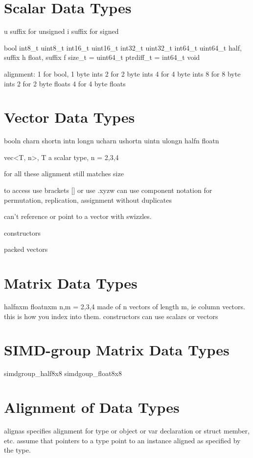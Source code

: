 

\section{Scalar Data Types}
u suffix for unsigned
i suffix for signed

bool
int8_t
uint8_t
int16_t
uint16_t
int32_t
uint32_t
int64_t
uint64_t
half, suffix h
float, suffix f
size_t = uint64_t
ptrdiff_t = int64_t
void

alignment:
1 for bool, 1 byte ints
2 for 2 byte ints
4 for 4 byte ints
8 for 8 byte ints
2 for 2 byte floats
4 for 4 byte floats

\section{Vector Data Types}

booln
charn
shortn
intn
longn
ucharn
ushortn
uintn
ulongn
halfn
floatn

vec<T, n>, T a scalar type, n = 2,3,4

for all these alignment still matches size

to access use brackets [] or use .xyzw
can use component notation for permutation, replication, assignment without duplicates

can't reference or point to a vector with swizzles.

constructors

packed vectors

\section{Matrix Data Types}

halfnxm
floatnxm
n,m = 2,3,4
made of n vectors of length m, ie column vectors. this is how you index into them.
constructors can use scalars or vectors

\section{SIMD-group Matrix Data Types}

simdgroup_half8x8
simdgoup_float8x8

\section{Alignment of Data Types}

alignas specifies alignment for type or object or var declaration or struct member, etc.
assume that pointers to a type point to an instance aligned as specified by the type.

